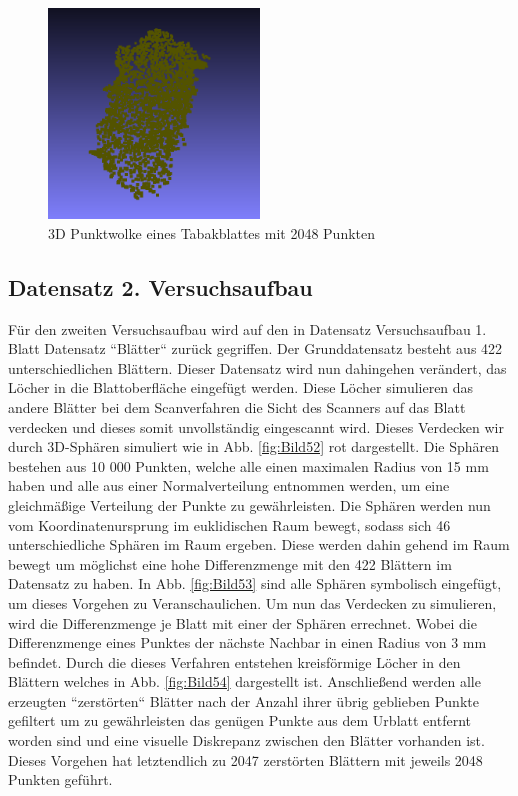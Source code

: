 \documentclass{llncs}
\begin{document}
\begin{figure}[htbp] 
	\centering
	\includegraphics[width=0.5\textwidth]{leaf1.png}
	\caption{3D Punktwolke eines Tabakblattes mit 2048 Punkten}
	\label{fig:Bild51}
\end{figure}
\newpage
\subsection{Datensatz 2. Versuchsaufbau}\label{sec:versuch2_daten}

Für den zweiten Versuchsaufbau wird auf den in Datensatz Versuchsaufbau 1. Blatt Datensatz ``Blätter`` zurück gegriffen. Der Grunddatensatz besteht aus 422 unterschiedlichen Blättern. Dieser Datensatz wird nun dahingehen verändert, das Löcher in die Blattoberfläche eingefügt werden. Diese Löcher simulieren das andere Blätter bei dem Scanverfahren die Sicht des Scanners auf das Blatt verdecken und dieses somit unvollständig eingescannt wird. Dieses Verdecken wir durch 3D-Sphären simuliert wie in Abb. \ref{fig:Bild52}  rot dargestellt. Die Sphären bestehen aus 10 000 Punkten, welche alle einen maximalen Radius von 15 mm haben und alle aus einer Normalverteilung entnommen werden, um  eine gleichmäßige Verteilung der Punkte zu gewährleisten. Die Sphären werden nun vom Koordinatenursprung im euklidischen Raum bewegt, sodass sich 46 unterschiedliche Sphären im Raum ergeben. Diese werden dahin gehend im Raum bewegt um möglichst eine hohe Differenzmenge mit den 422 Blättern im Datensatz zu haben. In Abb. \ref{fig:Bild53} sind alle Sphären symbolisch eingefügt, um dieses Vorgehen zu Veranschaulichen. Um nun das Verdecken zu simulieren, wird die Differenzmenge je Blatt mit einer der Sphären errechnet. Wobei die Differenzmenge eines Punktes der nächste Nachbar in einen Radius von 3 mm befindet. Durch die dieses Verfahren entstehen kreisförmige Löcher in den Blättern welches in Abb. \ref{fig:Bild54} dargestellt ist. Anschließend werden alle erzeugten ``zerstörten`` Blätter nach der Anzahl ihrer übrig geblieben Punkte gefiltert um zu gewährleisten das genügen Punkte aus dem Urblatt entfernt worden sind und eine visuelle Diskrepanz zwischen den Blätter vorhanden ist. Dieses Vorgehen hat letztendlich zu 2047 zerstörten Blättern mit jeweils 2048 Punkten geführt.
\end{document}
